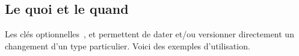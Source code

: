 \documentclass{tutodoc}
\begin{document}
\subsection{Le quoi et le quand}

Les clés optionnelles \,,  et  permettent de dater et/ou versionner directement un changement d'un type particulier. Voici des exemples d'utilisation.

\end{document}
